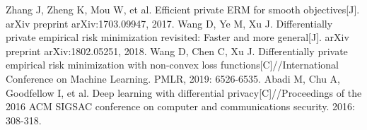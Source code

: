 \documentclass[12pt,openany,a4paper,fancyhdr,oneside]{ctexbook}
\begin{document}
\begin{thebibliography}{99}
Zhang J, Zheng K, Mou W, et al. Efficient private ERM for smooth objectives[J]. arXiv preprint arXiv:1703.09947, 2017.
Wang D, Ye M, Xu J. Differentially private empirical risk minimization revisited: Faster and more general[J]. arXiv preprint arXiv:1802.05251, 2018.
Wang D, Chen C, Xu J. Differentially private empirical risk minimization with non-convex loss functions[C]//International Conference on Machine Learning. PMLR, 2019: 6526-6535.
Abadi M, Chu A, Goodfellow I, et al. Deep learning with differential privacy[C]//Proceedings of the 2016 ACM SIGSAC conference on computer and communications security. 2016: 308-318.


\end{thebibliography}


\pagestyle{plain}
\clearpage
{}
{}


\pagestyle{plain}
\clearpage
{}
{}



\printindex
\end{document}
